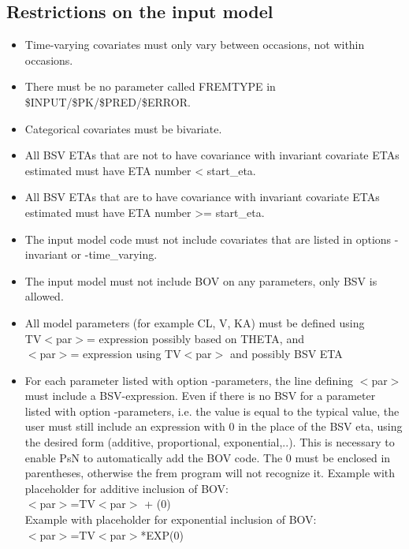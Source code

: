 \subsection{Restrictions on the input model}
\begin{itemize}
	\item Time-varying covariates must only vary between occasions, not within occasions. 
	\item There must be no parameter called FREMTYPE in \$INPUT/\$PK/\$PRED/\$ERROR.
	\item Categorical covariates must be bivariate.
    \item All BSV ETAs that are not to have covariance with invariant covariate ETAs estimated must have ETA number < start\_eta.
    \item All BSV ETAs that are to have covariance with invariant covariate ETAs estimated must have ETA number >= start\_eta.
    \item The input model code must not include covariates that are listed in 
    options -invariant or -time\_varying.
    \item The input model must not include BOV on any parameters, only BSV is allowed.
    \item All model parameters (for example CL, V, KA) must be defined using \\
    TV$<$par$>$= expression possibly based on THETA, and\\
    $<$par$>$= expression using TV$<$par$>$ and possibly BSV ETA
    \item For each parameter listed with option -parameters, 
    the line defining $<$par$>$ 
    must include a BSV-expression. Even if there is no 
    BSV for a parameter listed with option -parameters, 
    i.e. the value is equal to the typical value, the user must still 
    include an expression with 0 in the place of the BSV eta, using the desired form (additive, proportional, exponential,..). 
    This is necessary to enable PsN to automatically add the BOV code. The 0 must be enclosed in parentheses, otherwise the 
    frem program will not recognize it. Example with placeholder for additive inclusion of BOV:\\
    $<$par$>$=TV$<$par$>$ + (0) \\
    Example with placeholder for exponential inclusion of BOV:\\
    $<$par$>$=TV$<$par$>$*EXP(0) 
\end{itemize}


